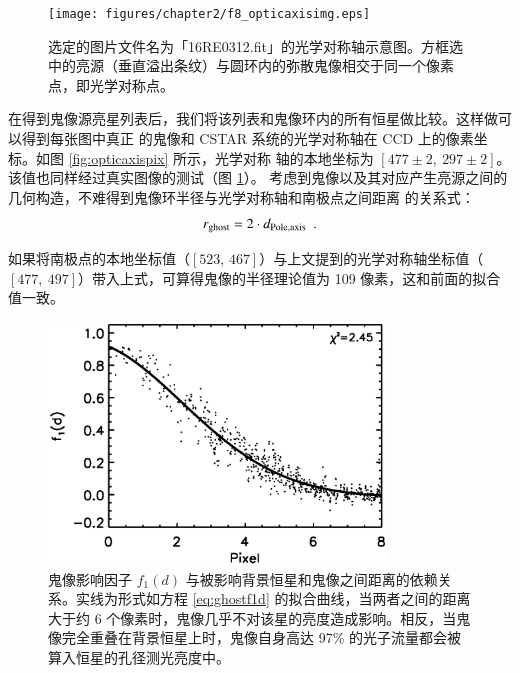 \begin{figure}[t]
\centering
\texttt{[image: figures/chapter2/f8\_opticaxisimg.eps]}
\caption{选定的图片文件名为「16RE0312.fit」的光学对称轴示意图。方框选中的亮源（垂直溢出条纹）与圆环内的弥散鬼像相交于同一个像素点，即光学对称点。}
\label{fig:opticaxisimg}
\end{figure}

在得到鬼像源亮星列表后，我们将该列表和鬼像环内的所有恒星做比较。这样做可以得到每张图中真正
的鬼像和 CSTAR 系统的光学对称轴在 CCD 上的像素坐标。如图 \ref{fig:opticaxispix} 所示，光学对称
轴的本地坐标为 $[477\pm2,\ 297\pm2]$。该值也同样经过真实图像的测试（图 \ref{fig:opticaxisimg}）。
考虑到鬼像以及其对应产生亮源之间的几何构造，不难得到鬼像环半径与光学对称轴和南极点之间距离
的关系式：
\begin{equation} \label{eq:ghostgeometry}
r_{\mathrm{ghost}}=2\cdot d_{\mathrm{Pole, axis}} \ \ . 
\end{equation} 

如果将南极点的本地坐标值（$[523,\,467]$）与上文提到的光学对称轴坐标值（$[477,\ 497]$）带入上式，可算得鬼像的半径理论值为 109 像素，这和前面的拟合值一致。

\begin{figure}[ht!]
\centering
\includegraphics[width=0.8\textwidth, trim={0.5cm 0.3cm 0.5cm 0}]{figures/chapter2/f9_ghostfit.eps}
\caption{鬼像影响因子 $f_1(d)$ 与被影响背景恒星和鬼像之间距离的依赖关系。实线为形式如方程 \ref{eq:ghostf1d} 的拟合曲线，当两者之间的距离大于约 6 个像素时，鬼像几乎不对该星的亮度造成影响。相反，当鬼像完全重叠在背景恒星上时，鬼像自身高达 97\% 的光子流量都会被算入恒星的孔径测光亮度中。}
\label{fig:ghostfit}
\end{figure}

